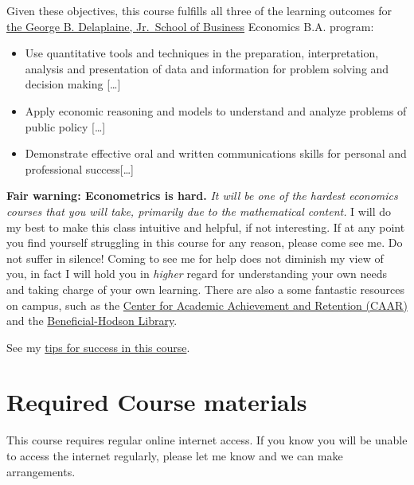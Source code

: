 \documentclass{article}
\providecommand{\tightlist}{%
  \setlength{\itemsep}{0pt}\setlength{\parskip}{0pt}}
\begin{document}
Given these objectives, this course fulfills all three of the learning
outcomes for
\href{https://www.hood.edu/academics/departments/george-b-delaplaine-jr-school-business/student-learning-outcomes}{the
George B. Delaplaine, Jr.~School of Business} Economics B.A. program:

\begin{itemize}
\tightlist
\item
  Use quantitative tools and techniques in the preparation,
  interpretation, analysis and presentation of data and information for
  problem solving and decision making {[}\ldots{]}
\item
  Apply economic reasoning and models to understand and analyze problems
  of public policy {[}\ldots{]}
\item
  Demonstrate effective oral and written communications skills for
  personal and professional success{[}\ldots{]}
\end{itemize}

\textbf{Fair warning: Econometrics is hard.} \emph{It will be one of the
hardest economics courses that you will take, primarily due to the
mathematical content.} I will do my best to make this class intuitive
and helpful, if not interesting. If at any point you find yourself
struggling in this course for any reason, please come see me. Do not
suffer in silence! Coming to see me for help does not diminish my view
of you, in fact I will hold you in \emph{higher} regard for
understanding your own needs and taking charge of your own learning.
There are also a some fantastic resources on campus, such as the
\href{http://www.hood.edu/campus-services/academic-services/index.html}{Center
for Academic Achievement and Retention (CAAR)} and the
\href{http://www.hood.edu/library/\%7D\%7BBeneficial-Hodson\%20Library}{Beneficial-Hodson
Library}.

See my
\href{http://metricsF20.classes.ryansafner.com/reference\#tips}{tips for
success in this course}.

\hypertarget{required-course-materials}{%
\section*{Required Course materials}\label{required-course-materials}}

This course requires regular online internet access. If you know you
will be unable to access the internet regularly, please let me know and
we can make arrangements.
\end{document}
